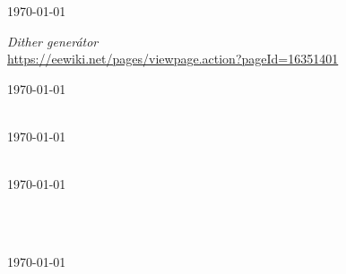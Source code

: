 \documentclass[a4paper,11pt]{article}
\begin{document}
\pagebreak
\begin{thebibliography}{}


\textit{}
\url{  }
\today


\textit{Dither generátor}\\
\url{https://eewiki.net/pages/viewpage.action?pageId=16351401}

\today


\textit{}\\
\url{}
\today


\textit{}\\
\url{}
\today


\textit{}\\



\textit{}\\
\url{}
\today


\end{thebibliography}
\end{document}
